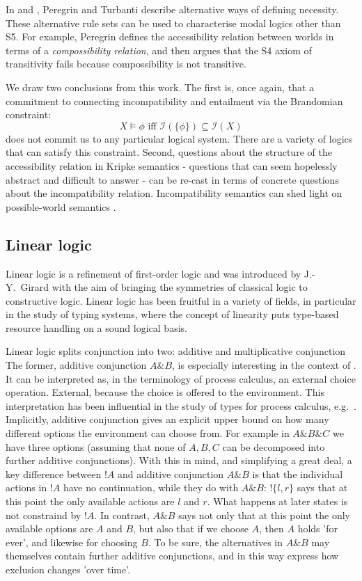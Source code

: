 In \cite{PeregrinJ:logbasoi} and \cite{turbanti}, Peregrin and Turbanti describe alternative ways of defining necessity.
These alternative rule sets can be used to characterise modal logics other than S5.
For example, Peregrin defines the accessibility relation between worlds in terms of a \emph{compossibility relation}, and then argues that the S4 axiom of transitivity fails because compossibility is not transitive.

We draw two conclusions from this work.
The first is, once again, that a commitment to connecting incompatibility and entailment via the Brandomian constraint:
\[
X \models \phi \text{ iff } \mathcal{I}(\{\phi\}) \subseteq \mathcal{I}(X)
\]
does not commit us to any particular logical system. 
There are a variety of logics that can satisfy this constraint.
Second, questions about the structure of the accessibility relation in Kripke semantics - questions that can seem hopelessly abstract and difficult to answer - can be re-cast in terms of concrete questions about the incompatibility relation.
Incompatibility semantics can shed light on possible-world semantics \cite{turbanti}. 

\subsection{Linear logic}

Linear logic \cite{GirardJY:linlog,GirardJY:protyp} is a refinement of
first-order logic and was introduced by J.-Y.~Girard with the aim of
bringing the symmetries of classical logic to constructive
logic. Linear logic has been fruitful in a variety of fields, in
particular in the study of typing systems, where the concept of
linearity puts type-based resource handling on a sound logical basis.

Linear logic splits conjunction into two: additive and multiplicative
conjunction The former, additive conjunction $A \& B$, is especially
interesting in the context of \cathoristic{}. It can be interpreted
\cite{AbramskyS:comintoll} as, in the terminology of process calculus,
an external choice operation. External, because the choice is offered
to the environment.  This interpretation has been influential in the
study of types for process calculus,
e.g.~\cite{HondaK:unitypsfsifLONG,TakeuchiK:intbaslaits,HondaK:lanpriatdfscbp}.
Implicitly, additive conjunction gives an explicit upper bound on how
many different options the environment can choose from. For example in
$A \& B \& C$ we have three options (assuming that none of $A, B, C$
can be decomposed into further additive conjunctions).  With this in
mind, and simplifying a great deal, a key difference between $!A$ and
additive conjunction $A \& B$ is that the individual actions in $!A$
have no continuation, while they do with $A \& B$: $!\{l, r\}$ says
that at this point the only available actions are $l$ and $r$. What
happens at later states is not constraind by $!A$.  In contrast, $A \&
B$ says not only that at this point the only available options are $A$
and $B$, but also that if we choose $A$, then $A$ holds 'for ever',
and likewise for choosing $B$. To be sure, the alternatives in $A \&
B$ may themselves contain further additive conjunctions, and in this
way express how exclusion changes 'over time'.

